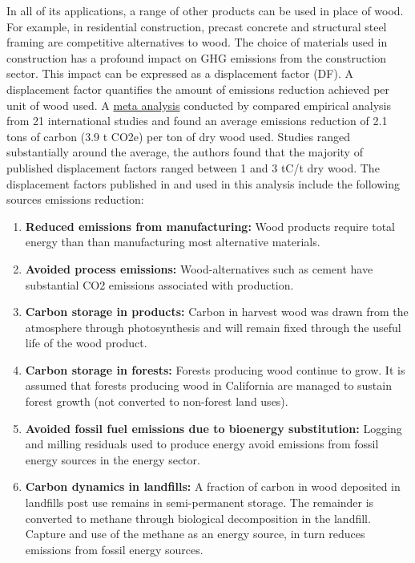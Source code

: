 \documentclass[a4paper]{article}
\begin{document}
In all of its applications, a range of other products can be used in place of wood. For example, in
residential construction, precast concrete and structural steel framing
are competitive alternatives to wood. The choice of materials used in
construction has a profound impact on GHG emissions from the
construction sector. This impact can be expressed as a displacement
factor (DF). A displacement factor quantifies the amount of emissions
reduction achieved per unit of wood used. A
\href{https://docs.google.com/uc?id=0B9-9Vlx0SkkFNjVGU0NrTm9HZ3M&export=download}{meta
analysis} conducted by \citep{Sathre2010} compared empirical analysis from 21 international studies and found an
average emissions reduction of 2.1 tons of carbon (3.9 t CO2e) per ton
of dry wood used. Studies ranged substantially around the average, the
authors found that the majority of published displacement factors ranged
between 1 and 3 tC/t dry wood. The displacement factors published in
\citep{Sathre2010} and used in this analysis include the
following sources emissions reduction:

\begin{enumerate}
\item \textbf{Reduced emissions from manufacturing:} Wood products require total
energy than than manufacturing most alternative materials.
\item \textbf{Avoided process emissions:} Wood-alternatives such as cement have
substantial CO2 emissions associated with production.
\item \textbf{Carbon storage in products:} Carbon in harvest wood was drawn from
the atmosphere through photosynthesis and will remain fixed through
the useful life of the wood product.
\item \textbf{Carbon storage in forests:} Forests producing wood continue to grow.
It is assumed that forests producing wood in California are managed
to sustain forest growth (not converted to non-forest land uses).
\item \textbf{Avoided fossil fuel emissions due to bioenergy substitution:}
Logging and milling residuals used to produce energy avoid emissions
from fossil energy sources in the energy sector.
\item \textbf{Carbon dynamics in landfills:} A fraction of carbon in wood
deposited in landfills post use remains in semi-permanent storage.
The remainder is converted to methane through biological
decomposition in the landfill. Capture and use of the methane as an
energy source, in turn reduces emissions from fossil energy sources.
\end{enumerate}
\end{document}
